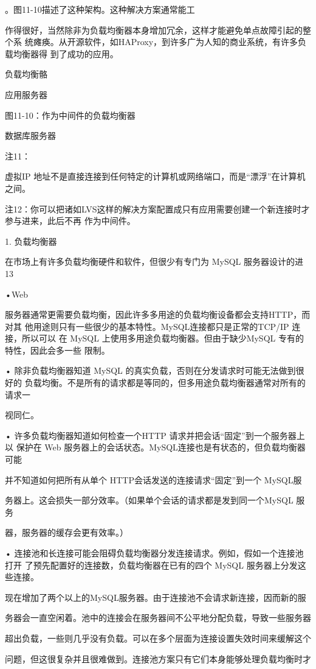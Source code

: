 。图11-10描述了这种架构。这种解决方案通常能工

作得很好，当然除非为负载均衡器本身增加冗余，这样才能避免单点故障引起的整个系
统瘫痪。从开源软件，如HAProxy，到许多广为人知的商业系统，有许多负载均衡器得
到了成功的应用。

负载均衡骼

应用服务器

图11-10：作为中间件的负载均衡器

数据库服务器

注11：

虚拟IP 地址不是直接连接到任何特定的计算机或网络端口，而是“漂浮”在计算机之间。

注12：你可以把诸如LVS这样的解决方案配置成只有应用需要创建一个新连接时才参与进来，此后不再
作为中间件。

1. 负载均衡器

在市场上有许多负载均衡硬件和软件，但很少有专门为 MySQL 服务器设计的进13

•Web

服务器通常更需要负载均衡，因此许多多用途的负载均衡设备都会支持HTTP，而对其
他用途则只有一些很少的基本特性。MySQL连接都只是正常的TCP/IP 连接，所以可以
在 MySQL 上使用多用途负载均衡器。但由于缺少MySQL 专有的特性，因此会多一些
限制。

• 除非负载均衡器知道 MySQL 的真实负载，否则在分发请求时可能无法做到很好的
负载均衡。不是所有的请求都是等同的，但多用途负载均衡器通常对所有的请求一

视同仁。

• 许多负载均衡器知道如何检查一个HTTP 请求并把会话“固定”到一个服务器上以
保护在 Web 服务器上的会话状态。MySQL连接也是有状态的，但负载均衡器可能

并不知道如何把所有从单个 HTTP会话发送的连接请求“固定”到一个 MySQL服

务器上。这会损失一部分效率。（如果单个会话的请求都是发到同一个MySQL 服务

器，服务器的缓存会更有效率。）

• 连接池和长连接可能会阻碍负载均衡器分发连接请求。例如，假如一个连接池打开
了预先配置好的连接数，负载均衡器在已有的四个 MySQL 服务器上分发这些连接。

现在增加了两个以上的MySQL服务器。由于连接池不会请求新连接，因而新的服

务器会一直空闲着。池中的连接会在服务器间不公平地分配负载，导致一些服务器

超出负载，一些则几乎没有负载。可以在多个层面为连接设置失效时间来缓解这个

问题，但这很复杂并且很难做到。连接池方案只有它们本身能够处理负载均衡时才

